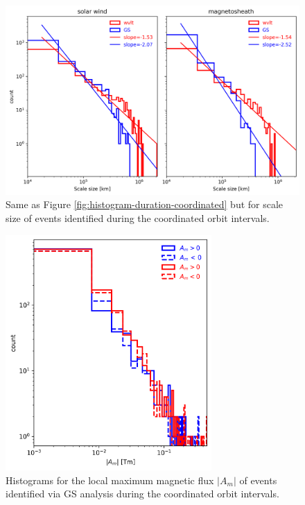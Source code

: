 \begin{figure}
    \centering
    \includegraphics[width=\textwidth]{Figures/Histograms/scalesize_coordinated.png}
    \caption[Histogram of scale size from coordinated analysis]{Same as Figure \ref{fig:histogram-duration-coordinated} but for scale size of events identified during the coordinated orbit intervals.}
    \label{fig:histogram-scalesize-coordinated}
\end{figure}

\begin{figure}
    \centering
    \includegraphics[width=0.7\textwidth]{Figures/Histograms/Asplit_coordinated.png}
    \caption[Histogram of poloidal magnetic ﬂux per unit length from coordinated analysis]{Histograms for the local maximum magnetic flux $|A_m|$ of events identified via GS analysis during the coordinated orbit intervals.}
    \label{fig:histogram-Asplit-coordinated}
\end{figure}


